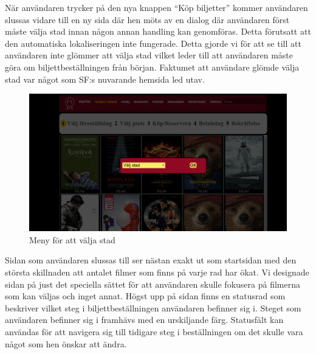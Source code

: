 \documentclass[swedish,a4paper,11pt]{article}
\begin{document}
\newpage
När användaren trycker på den nya knappen “Köp biljetter” kommer användaren slussas vidare till en ny sida där hen möts av en dialog där användaren först måste välja stad innan någon annan handling kan genomföras. Detta förutsatt att den automatiska lokaliseringen inte fungerade. Detta gjorde vi för att se till att användaren inte glömmer att välja stad vilket leder till att användaren måste göra om biljettbeställningen från början. Faktumet att användare glömde välja stad var något som SF:s nuvarande hemsida led utav.  

\noindent

\begin{figure}[h]
\centering
\includegraphics[scale=0.27]{valavstad.png} 
\caption{Meny för att välja stad}
\end{figure}

\newpage
Sidan som användaren slussas till ser nästan exakt ut som startsidan med den största skillnaden att antalet filmer som finns på varje rad har ökat. Vi designade sidan på just det speciella sättet för att användaren skulle fokusera på filmerna som kan väljas och inget annat. 
Högst upp på sidan finns en statusrad som beskriver vilket steg i biljettbeställningen användaren befinner sig i. Steget som användaren befinner sig i framhävs med en urskiljande färg. Statusfält kan användas för att navigera sig till tidigare steg i beställningen om det skulle vara något som hen önskar att ändra.\\
\end{document}

